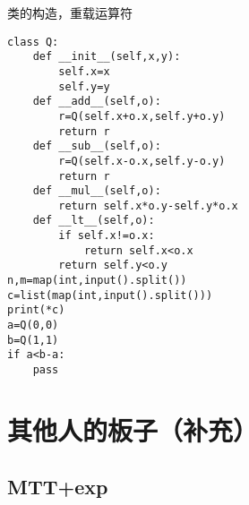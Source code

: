 \documentclass[12pt]{ctexart}
\begin{document}
类的构造，重载运算符
\begin{lstlisting}
class Q:
	def __init__(self,x,y):
		self.x=x
		self.y=y
	def __add__(self,o):
		r=Q(self.x+o.x,self.y+o.y)
		return r
	def __sub__(self,o):
		r=Q(self.x-o.x,self.y-o.y)
		return r
	def __mul__(self,o):
		return self.x*o.y-self.y*o.x
	def __lt__(self,o):
		if self.x!=o.x:
			return self.x<o.x
		return self.y<o.y
n,m=map(int,input().split())
c=list(map(int,input().split()))
print(*c)
a=Q(0,0)
b=Q(1,1)
if a<b-a:
	pass
\end{lstlisting}

\newpage

\section{其他人的板子（补充）}

\subsection{MTT+exp}
\end{document}
